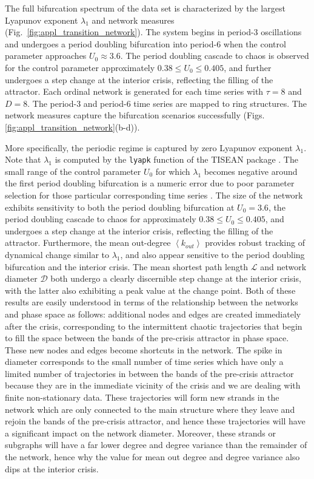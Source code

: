 	The full bifurcation spectrum of the data set is characterized by the largest Lyapunov exponent $\lambda_1$ and network measures (Fig.~\ref{fig:appl_transition_network}). The system begins in period-3 oscillations and undergoes a period doubling bifurcation into period-6 when the control parameter approaches $U_0 \approx 3.6$. The period doubling cascade to chaos is observed for the control parameter approximately $0.38 \leq U_0 \leq 0.405$, and further undergoes a step change at the interior crisis, reflecting the filling of the attractor. Each ordinal network is generated for each time series with $\tau = 8$ and $D = 8$. The period-3 and period-6 time series are mapped to ring structures. The network measures capture the bifurcation scenarios successfully (Figs.\ref{fig:appl_transition_network}(b-d)).

	More specifically, the periodic regime is captured by zero Lyapunov exponent $\lambda_1$. Note that $\lambda_1$ is computed by the {\tt{lyapk}} function of the TISEAN package \cite{kantz1997}. The small range of the control parameter $U_0$ for which $\lambda_1$ becomes negative around the first period doubling bifurcation is a numeric error due to poor parameter selection for those particular corresponding time series \cite{McCullough2015}. The size of the network exhibits sensitivity to both the period doubling bifurcation at $U_0 =3.6$, the period doubling cascade to chaos for approximately $0.38 \leq U_0 \leq 0.405$, and undergoes a step change at the interior crisis, reflecting the filling of the attractor. Furthermore, the mean out-degree $\left < k_{out} \right>$ provides robust tracking of dynamical change similar to $\lambda_1$, and also appear sensitive to the period doubling bifurcation and the interior crisis. The mean shortest path length $\mathcal{L}$ and network diameter $\mathcal{D}$ both undergo a clearly discernible step change at the interior crisis, with the latter also exhibiting a peak value at the change point. Both of these results are easily understood in terms of the relationship between the networks and phase space as follows: additional nodes and edges are created immediately after the crisis, corresponding to the intermittent chaotic trajectories that begin to fill the space between the bands of the pre-crisis attractor in phase space. These new nodes and edges become shortcuts in the network. The spike in diameter corresponds to the small number of time series which have only a limited number of trajectories in between the bands of the pre-crisis attractor because they are in the immediate vicinity of the crisis and we are dealing with finite non-stationary data. These trajectories will form new strands in the network which are only connected to the main structure where they leave and rejoin the bands of the pre-crisis attractor, and hence these trajectories will have a significant impact on the network diameter. Moreover, these strands or subgraphs will have a far lower degree and degree variance than the remainder of the network, hence why the value for mean out degree and degree variance also dips at the interior crisis.

